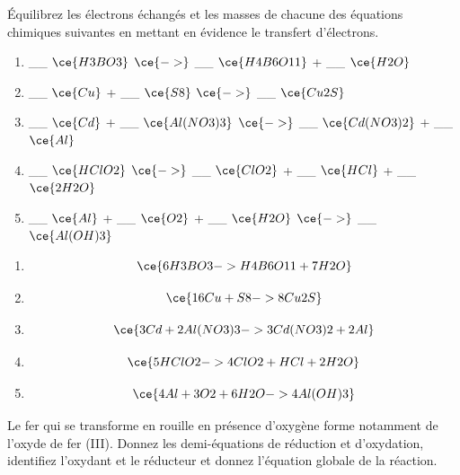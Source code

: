 \documentclass[
  11pt,
  french,
  a4paper,
  openany]{book}
\providecommand{\tightlist}{%
  \setlength{\itemsep}{0pt}\setlength{\parskip}{0pt}}
\begin{document}
\begin{Exercise}

Équilibrez les électrons échangés et les masses de chacune des équations chimiques suivantes en mettant en évidence le transfert d'électrons.

\begin{enumerate}
\def\labelenumi{\alph{enumi}.}
\tightlist
\item
  \_\_ \(\ce{H3BO3}\) \(\ce{->}\) \_\_ \(\ce{H4B6O11}\) + \_\_ \(\ce{H2O}\)
  \vspace{1em}
\item
  \_\_ \(\ce{Cu}\) + \_\_ \(\ce{S8}\) \(\ce{->}\) \_\_ \(\ce{Cu2S}\)
  \vspace{1em}
\item
  \_\_ \(\ce{Cd}\) + \_\_ \(\ce{Al(NO3)3}\) \(\ce{->}\) \_\_ \(\ce{Cd(NO3)2}\) + \_\_ \(\ce{Al}\)
  \vspace{1em}
\item
  \_\_ \(\ce{HClO2}\) \(\ce{->}\) \_\_ \(\ce{ClO2}\) + \_\_ \(\ce{HCl}\) + \_\_ \(\ce{2 H2O}\)
  \vspace{1em}
\item
  \_\_ \(\ce{Al}\) + \_\_ \(\ce{O2}\) + \_\_ \(\ce{H2O}\) \(\ce{->}\) \_\_ \(\ce{Al(OH)3}\)
  \vspace{1em}
\end{enumerate}


\end{Exercise}

\begin{Answer}

\begin{enumerate}
\def\labelenumi{\alph{enumi}.}
\tightlist
\item
  \[
  \ce{6 H3BO3  -> H4B6O11 + 7 H2O}
  \]
\item
  \[
  \ce{16 Cu + S8  -> 8 Cu2S}
  \]
\item
  \[
  \ce{3 Cd + 2 Al(NO3)3  -> 3 Cd(NO3)2 + 2 Al}
  \]
\item
  \[
  \ce{5 HClO2  -> 4 ClO2 + HCl + 2 H2O}
  \]
\item
  \[
  \ce{4 Al + 3 O2 + 6 H2O -> 4 Al(OH)3}
  \]
\end{enumerate}


\end{Answer}

\clearpage

\begin{Exercise}
Le fer qui se transforme en rouille en présence d'oxygène forme notamment de l'oxyde de fer (III). Donnez les demi-équations de réduction et d'oxydation, identifiez l'oxydant et le réducteur et donnez l'équation globale de la réaction.

\end{Exercise}
\end{document}
